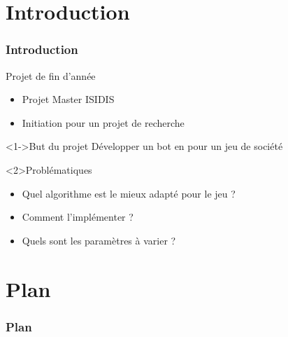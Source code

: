 \section*{Introduction}
	\begin{frame}
		\frametitle{Introduction}
		
		\begin{block}{Projet de fin d'année}
			\begin{itemize}
			\item Projet Master ISIDIS
			\item Initiation pour un projet de recherche	
			\end{itemize}
		\end{block}
	
		\begin{block}<1->{But du projet}		
			Développer un bot en \java pour un jeu de société \himalaya		
		\end{block}
	
		\begin{alertblock}<2>{Problématiques}
			\begin{itemize}
				\item Quel algorithme est le mieux adapté pour le jeu \himalaya ?
				\item Comment l'implémenter ?
				\item Quels sont les paramètres à varier ?
			\end{itemize}
		\end{alertblock}
	
	\end{frame}
	
	
\section*{Plan}
	\begin{frame} 
		\frametitle{Plan}
		\tableofcontents
	\end{frame}